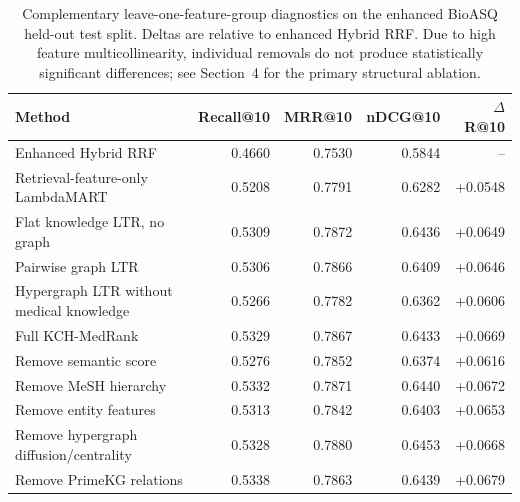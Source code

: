 \begin{table}[t]
\centering
\small
\caption{Complementary leave-one-feature-group diagnostics on the enhanced BioASQ held-out test split. Deltas are relative to enhanced Hybrid RRF. Due to high feature multicollinearity, individual removals do not produce statistically significant differences; see Section~4 for the primary structural ablation.}
\label{tab:kch-ablation-summary}
\begin{tabular}{lrrrr}
\toprule
Method & Recall@10 & MRR@10 & nDCG@10 & $\Delta$R@10 \\
\midrule
Enhanced Hybrid RRF & 0.4660 & 0.7530 & 0.5844 & -- \\
Retrieval-feature-only LambdaMART & 0.5208 & 0.7791 & 0.6282 & +0.0548 \\
Flat knowledge LTR, no graph & 0.5309 & 0.7872 & 0.6436 & +0.0649 \\
Pairwise graph LTR & 0.5306 & 0.7866 & 0.6409 & +0.0646 \\
Hypergraph LTR without medical knowledge & 0.5266 & 0.7782 & 0.6362 & +0.0606 \\
Full KCH-MedRank & 0.5329 & 0.7867 & 0.6433 & +0.0669 \\
Remove semantic score & 0.5276 & 0.7852 & 0.6374 & +0.0616 \\
Remove MeSH hierarchy & 0.5332 & 0.7871 & 0.6440 & +0.0672 \\
Remove entity features & 0.5313 & 0.7842 & 0.6403 & +0.0653 \\
Remove hypergraph diffusion/centrality & 0.5328 & 0.7880 & 0.6453 & +0.0668 \\
Remove PrimeKG relations & 0.5338 & 0.7863 & 0.6439 & +0.0679 \\
\bottomrule
\end{tabular}
\end{table}
